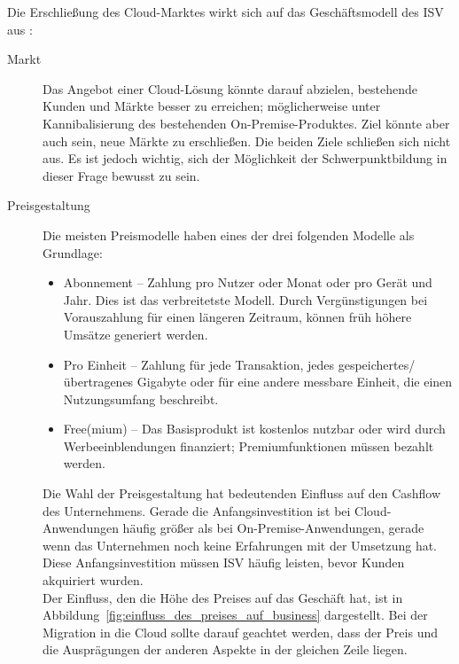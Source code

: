 Die Erschließung des Cloud-Marktes wirkt sich auf das Geschäftsmodell des ISV 
aus :
\begin{description}
	\item[Markt] Das Angebot einer Cloud-Lösung könnte darauf abzielen,
bestehende Kunden und Märkte besser zu erreichen; möglicherweise unter
Kannibalisierung des bestehenden On-Premise-Produktes. Ziel könnte aber auch
sein, neue Märkte zu erschließen. Die beiden Ziele schließen sich nicht aus. Es ist
jedoch wichtig, sich der Möglichkeit der Schwerpunktbildung in dieser Frage
bewusst zu sein.
	\item[Preisgestaltung] Die meisten Preismodelle haben eines der drei 
folgenden Modelle als Grundlage:
	\begin{itemize}
		\item Abonnement -- Zahlung pro Nutzer oder Monat oder pro Gerät und Jahr. Dies
ist das verbreitetste Modell. Durch Vergünstigungen bei Vorauszahlung für einen
längeren Zeitraum, können früh höhere Umsätze generiert werden.
		\item Pro Einheit -- Zahlung für jede Transaktion, jedes
gespeichertes/übertragenes Gigabyte oder für eine andere messbare Einheit, die
einen Nutzungsumfang beschreibt.
		\item Free(mium) -- Das Basisprodukt ist kostenlos nutzbar oder
wird durch Werbeeinblendungen finanziert; Premiumfunktionen müssen bezahlt
werden.
	\end{itemize}
	Die Wahl der Preisgestaltung hat bedeutenden Einfluss auf den Cashflow
des Unternehmens. Gerade die Anfangsinvestition ist bei Cloud-Anwendungen 
häufig größer als bei On-Premise-Anwendungen, gerade wenn das Unternehmen noch 
keine Erfahrungen mit der Umsetzung hat. Diese Anfangsinvestition müssen ISV 
häufig leisten, bevor Kunden akquiriert wurden. \\
Der Einfluss, den die Höhe des Preises auf das Geschäft hat, ist in
Abbildung~\ref{fig:einfluss_des_preises_auf_business} dargestellt. Bei der
Migration in die Cloud sollte darauf geachtet werden, dass der Preis und die
Ausprägungen der anderen Aspekte in der gleichen Zeile liegen.

\end{description}
